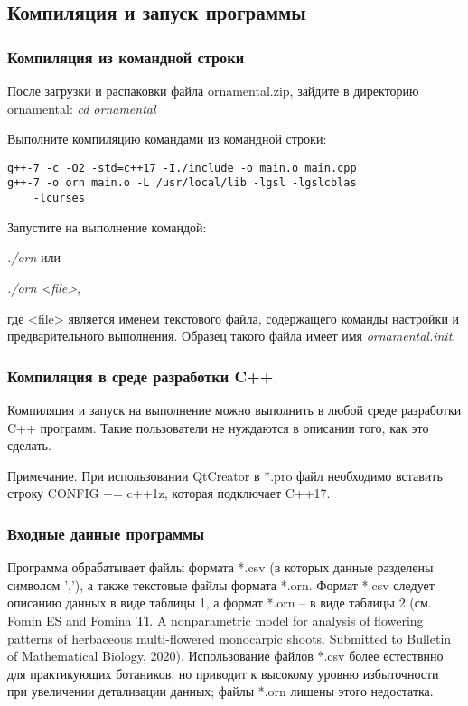 \documentclass[a4paper]{article}
\begin{document}
\subsection{Компиляция и запуск программы}

\subsubsection{Компиляция из командной строки}
После загрузки и распаковки файла ornamental.zip, зайдите в директорию 
ornamental: \textit{cd ornamental}
 
Выполните компиляцию командами из командной строки:
\begin{lstlisting}
g++-7 -c -O2 -std=c++17 -I./include -o main.o main.cpp
g++-7 -o orn main.o -L /usr/local/lib -lgsl -lgslcblas 
	-lcurses
\end{lstlisting}
Запустите на выполнение командой: 

\textit{./orn} или 

\textit{./orn <file>}, 

где <file> является именем текстового файла, содержащего команды настройки и предварительного выполнения. Образец такого файла имеет имя \textit{ornamental.init}.

\subsubsection{Компиляция в среде разработки C++}
Компиляция и запуск на выполнение можно выполнить в любой среде разработки C++ программ. Такие пользователи не нуждаются в описании того, как это сделать.

Примечание. При использовании QtCreator в *.pro файл необходимо вставить строку CONFIG += c++1z, которая подключает C++17.

\subsubsection{Входные данные программы}
Программа обрабатывает файлы формата *.csv (в которых данные разделены символом ','), а также текстовые файлы формата *.orn. Формат *.csv следует описанию данных в виде таблицы 1, а формат *.orn -- в виде таблицы 2 (см. Fomin ES and Fomina TI. A nonparametric model for analysis of flowering patterns of herbaceous multi-flowered monocarpic shoots. Submitted to Bulletin of Mathematical Biology, 2020). Использование файлов *.csv более естествнно для практикующих ботаников, но приводит к высокому уровню избыточности при увеличении детализации данных; файлы *.orn лишены этого недостатка.
\end{document}
